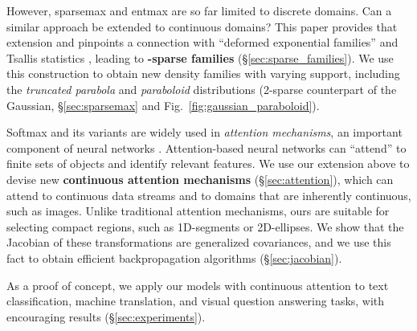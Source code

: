 \documentclass{article}
\newcommand{\remove}[1]{}
\begin{document}
However, {sparsemax} and {entmax} are so far limited to discrete domains. Can a similar approach be extended to continuous domains? This paper provides that extension and pinpoints a connection with ``deformed exponential families'' \citep{naudts2009q,sears2010generalized,ding2010t} and Tsallis statistics \citep{Tsallis1988}, leading to {\bf -sparse families} (\S\ref{sec:sparse_families}). 
We use this construction to obtain new density families with varying support, 
including the {\it truncated parabola} and {\it paraboloid} distributions (2-sparse counterpart of the Gaussian, \S\ref{sec:sparsemax} and Fig.~\ref{fig:gaussian_paraboloid}). 

Softmax and its variants are widely used in \textit{attention mechanisms}, an important component of neural networks \citep{bahdanau2014neural}. Attention-based neural networks can ``attend'' to finite sets of objects and identify relevant features. 
We use our extension above to devise new {\bf continuous attention mechanisms} (\S\ref{sec:attention}), which can attend to continuous data streams and to domains that are inherently continuous, such as images. Unlike traditional attention mechanisms, ours are suitable for selecting compact regions, such as 1D-segments or 2D-ellipses. We show that the Jacobian of these transformations are generalized covariances, and we use this fact to obtain efficient backpropagation algorithms (\S\ref{sec:jacobian}). 

As a proof of concept, we apply our models with continuous attention to text classification, machine translation, and visual question answering tasks, with encouraging results (\S\ref{sec:experiments}).

\remove{We also generalize the recent Fenchel-Young (FY) losses \citep{blondel2020learning} 
to arbitrary domains, illustrating their usefulness by estimating sparse continuous densities for regression problems under bounded noise \citep{d2013bounded}. We show that properties of FY losses hold for general -sparse families, including convexity and closed-form gradient w.r.t.\ their canonical parameters. We use this to perform interval regression, which returns mean estimates and intervals, based on the support of their distribution.} 
\end{document}
